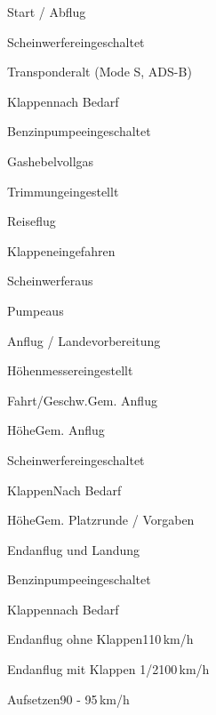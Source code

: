 \begin{checklist}{Start / Abflug}
	  \item{Scheinwerfer}{eingeschaltet}
	  \item{Transponder}{alt (Mode S, ADS-B)}
	  \item{Klappen}{nach Bedarf}
	  \item{Benzinpumpe}{eingeschaltet}
	  \item{Gashebel}{vollgas}
	\item{Trimmung}{eingestellt}
\end{checklist}
	
\begin{checklist}{Reiseflug}
	\item{Klappen}{eingefahren}
	\item{Scheinwerfer}{aus}
	\item{Pumpe}{aus} 
	 
\end{checklist}

\begin{checklist}{Anflug / Landevorbereitung}
	\item{Höhenmesser}{eingestellt}
	\item{Fahrt/Geschw.}{Gem. Anflug}
	\item{Höhe}{Gem. Anflug}
	\item{Scheinwerfer}{eingeschaltet}
	\item{Klappen}{Nach Bedarf}
	\item{Höhe}{Gem. Platzrunde / Vorgaben}
\end{checklist}

\begin{checklist}{Endanflug und Landung}
	\item{Benzinpumpe}{eingeschaltet}
	\item{Klappen}{nach Bedarf}
	\item{Endanflug ohne Klappen}{110\,km/h}
	\item{Endanflug mit Klappen 1/2}{100\,km/h}
	\item{Aufsetzen}{90 - 95\,km/h}
\end{checklist}

